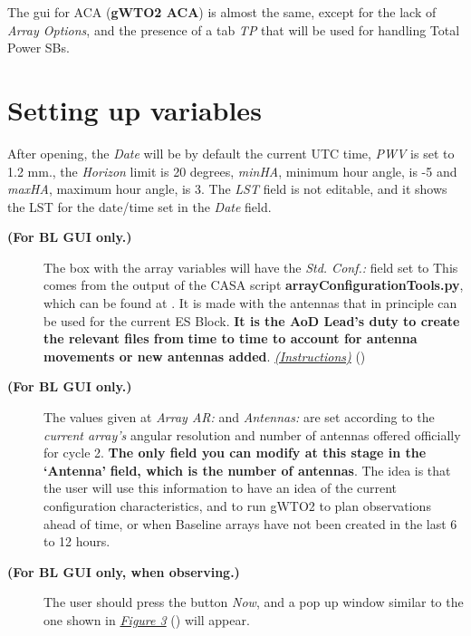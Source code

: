 \documentclass[a4paper,10pt,english]{sphinxmanual}
\begin{document}
The gui for ACA (\textbf{gWTO2 ACA}) is almost the same, except for the lack
of \emph{Array Options}, and the presence of a tab \emph{TP} that
will be used for handling Total Power SBs.


\section{Setting up variables}
\label{usingwto:setting-up-variables}
After opening, the \emph{Date} will be by default the current UTC time,
\emph{PWV} is set to 1.2 mm., the \emph{Horizon} limit is 20 degrees,
\emph{minHA}, minimum hour angle, is -5 and \emph{maxHA}, maximum
hour angle, is 3. The \emph{LST} field is not editable, and it shows the
LST for the date/time set in the \emph{Date} field.
\begin{description}
\item[{\textbf{(For BL GUI only.)}}] \leavevmode
The box with the array variables will have the
\emph{Std. Conf.:} field set to 
This  comes from the output of the CASA script
\textbf{arrayConfigurationTools.py}, which can be found at
.
It is made with the antennas that in principle can be used for the current
ES Block. \textbf{It is the AoD Lead's duty to create the relevant files from}
\textbf{time to time to account for antenna movements or new antennas added}.
{\hyperref[apendix:current-conf]{\emph{(Instructions)}}} ()

\item[{\textbf{(For BL GUI only.)}}] \leavevmode
The values given at \emph{Array AR:}  and \emph{Antennas:}
are set according to the \emph{current array's} angular resolution and
number of antennas offered officially for cycle 2.
\textbf{The only field you can modify at this stage in the `Antenna'}
\textbf{field, which is the number of antennas}. The idea is that the user will use
this information to have an idea of the current configuration characteristics,
and to run gWTO2 to plan observations ahead of time, or when Baseline arrays
have not been created in the last 6 to 12 hours.

\item[{\textbf{(For BL GUI only, when observing.)}}] \leavevmode
The user should press the button \emph{Now}, and a pop up window
similar to the one shown in {\hyperref[usingwto:fig3]{\emph{Figure 3}}} () will appear.

\end{description}
\end{document}
